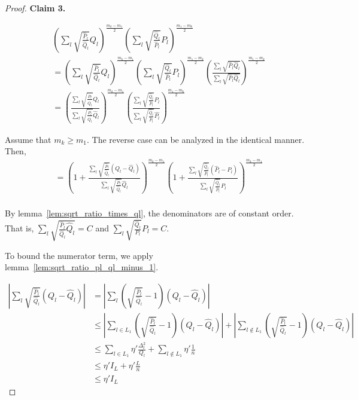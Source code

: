\begin{proof}
\textbf{Claim 3.} 

\begin{align*}
& \left( \sum_l \sqrt{\frac{\hat{P}_l}{\hat{Q}_l}} Q_l \right)^{\frac{m_k - m_1}{2}} 
 \left( \sum_l \sqrt{\frac{\hat{Q}_l}{\hat{P}_l}} P_l \right)^{\frac{m_1 - m_k}{2}} \\
&= \left( \sum_l \sqrt{\frac{\hat{P}_l}{\hat{Q}_l}} Q_l \right)^{\frac{m_k - m_1}{2}} 
 \left( \sum_l \sqrt{\frac{\hat{Q}_l}{\hat{P}_l}} P_l \right)^{\frac{m_1 - m_k}{2}} 
   \left( \frac{\sum_l \sqrt{\hat{P}_l \hat{Q}_l}}{\sum_l \sqrt{\hat{P}_l \hat{Q}_l}} \right)^{\frac{m_1 - m_k}{2}} \\
&=  \left( 
   \frac{\sum_l \sqrt{\frac{\hat{P}_l}{\hat{Q}_l}} Q_l}
        {\sum_l \sqrt{\frac{\hat{P}_l}{\hat{Q}_l}} \hat{Q}_l} 
     \right)^{\frac{m_k - m_1}{2}} 
   \left( \frac{\sum_l \sqrt{\frac{\hat{Q}_l}{\hat{P}_l}} P_l}
         {\sum_l \sqrt{\frac{\hat{Q}_l}{\hat{P}_l}} \hat{P_l} } \right)^{\frac{m_1 - m_k}{2}} 
\end{align*}

Assume that $m_k \geq m_1$. The reverse case can be analyzed in the identical manner. Then,
\begin{align*}
&= \left( 1 + 
   \frac{\sum_l \sqrt{\frac{\hat{P}_l}{\hat{Q}_l}} (Q_l - \hat{Q}_l)}
        {\sum_l \sqrt{\frac{\hat{P}_l}{\hat{Q}_l}} \hat{Q}_l} 
     \right)^{\frac{m_k - m_1}{2}} 
   \left( 1+ \frac{\sum_l \sqrt{\frac{\hat{Q}_l}{\hat{P}_l}} (\hat{P}_l - P_l)}
         {\sum_l \sqrt{\frac{\hat{Q}_l}{\hat{P}_l}} P_l } \right)^{\frac{m_k - m_1}{2}} 
   \\
\end{align*}

By lemma~\ref{lem:sqrt_ratio_times_ql}, the denominators are of constant order. That is, 
$\sum_l \sqrt{ \frac{ \hat{P}_l }{ \hat{Q}_l } \hat{Q}_l } = C$ and 
$\sum_l \sqrt{ \frac{\hat{Q}_l}{P_l} } P_l = C$. 

To bound the numerator term, we apply lemma~\ref{lem:sqrt_ratio_pl_ql_minus_1}. 

\begin{align*}
\left| \sum_l \sqrt{\frac{\hat{P}_l}{\hat{Q}_l}} (Q_l - \hat{Q}_l) \right|  &= 
  \left|  \sum_l \left( \sqrt{\frac{\hat{P}_l}{\hat{Q}_l}} -1 \right) (Q_l - \hat{Q}_l) 
 \right| \\
& \leq \left| \sum_{l \in L_1} \left( \sqrt{\frac{\hat{P}_l}{\hat{Q}_l}} -1 \right) (Q_l - \hat{Q}_l) \right| +  %
  \left| \sum_{l \notin L_1} \left( \sqrt{\frac{\hat{P}_l}{\hat{Q}_l}} -1 \right) (Q_l - \hat{Q}_l) \right| \\
& \leq \sum_{l \in L_1} \eta' \frac{\Delta_l^2}{Q_l} + \sum_{l \notin L_1} \eta' \frac{1}{n} \\
& \leq \eta' I_L + \eta' \frac{L}{n}  \\
& \leq \eta' I_L  
\end{align*}


\end{proof}
